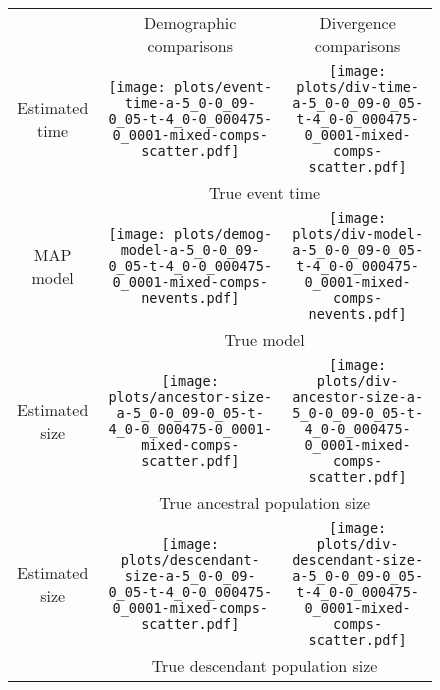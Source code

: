 \documentclass[border=10pt,varwidth=30cm]{standalone}
\begin{document}
\begin{figure}
    \centering
    \begin{tabular}{@{}ccc@{}}
        & \multirow{1}{0.15\textwidth}{\Large\centering Demographic comparisons}
        & \multirow{1}{0.15\textwidth}{\Large\centering Divergence comparisons} \\[5ex]
        \multirow{1}{*}[8em]{\begin{sideways}\large Estimated time\end{sideways}}
        & \texttt{[image: plots/event-time-a-5\_0-0\_09-0\_05-t-4\_0-0\_000475-0\_0001-mixed-comps-scatter.pdf]}
        & \texttt{[image: plots/div-time-a-5\_0-0\_09-0\_05-t-4\_0-0\_000475-0\_0001-mixed-comps-scatter.pdf]} \\
        & \multicolumn{2}{c}{\large True event time} \\
        \multirow{1}{*}[7.5em]{\begin{sideways}\large MAP model\end{sideways}}
        & \texttt{[image: plots/demog-model-a-5\_0-0\_09-0\_05-t-4\_0-0\_000475-0\_0001-mixed-comps-nevents.pdf]}
        & \texttt{[image: plots/div-model-a-5\_0-0\_09-0\_05-t-4\_0-0\_000475-0\_0001-mixed-comps-nevents.pdf]} \\
        & \multicolumn{2}{c}{\large True model} \\
        \multirow{1}{*}[8em]{\begin{sideways}\large Estimated size\end{sideways}}
        & \texttt{[image: plots/ancestor-size-a-5\_0-0\_09-0\_05-t-4\_0-0\_000475-0\_0001-mixed-comps-scatter.pdf]}
        & \texttt{[image: plots/div-ancestor-size-a-5\_0-0\_09-0\_05-t-4\_0-0\_000475-0\_0001-mixed-comps-scatter.pdf]} \\
        & \multicolumn{2}{c}{\large True ancestral population size} \\
        \multirow{1}{*}[8em]{\begin{sideways}\large Estimated size\end{sideways}}
        & \texttt{[image: plots/descendant-size-a-5\_0-0\_09-0\_05-t-4\_0-0\_000475-0\_0001-mixed-comps-scatter.pdf]}
        & \texttt{[image: plots/div-descendant-size-a-5\_0-0\_09-0\_05-t-4\_0-0\_000475-0\_0001-mixed-comps-scatter.pdf]} \\
        & \multicolumn{2}{c}{\large True descendant population size} \\
    \end{tabular}
\end{figure}
\end{document}
